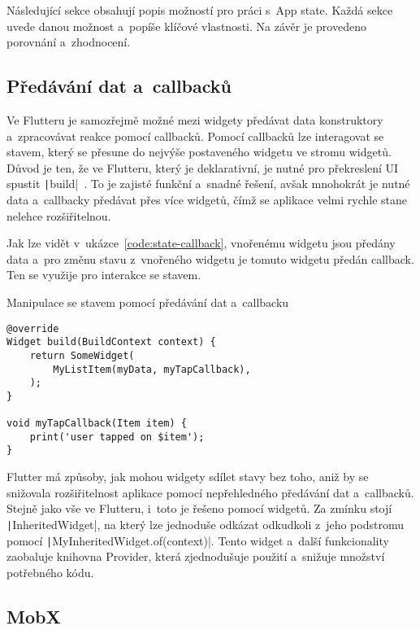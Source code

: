 Následující sekce obsahují popis možností pro práci s~App state.
Každá sekce uvede danou možnost a~popíše klíčové vlastnosti.
Na závěr je provedeno porovnání a~zhodnocení.

\subsection{Předávání dat a~callbacků}
\label{sec:data-callback-transfer}

Ve Flutteru je samozřejmě možné mezi widgety předávat data konstruktory
a~zpracovávat reakce pomocí callbacků. 
Pomocí callbacků lze interagovat se stavem,
který se přesune do nejvýše postaveného widgetu ve stromu widgetů.
Důvod je ten,
že ve Flutteru,
který je deklarativní,
je nutné pro překreslení UI spustit
\texttt|build|~\cite{flutter_state_mgmt_simple}.
To je zajisté funkční a~snadné řešení,
avšak mnohokrát je nutné data a~callbacky předávat přes více widgetů,
čímž se aplikace velmi rychle stane nelehce rozšiřitelnou.

Jak lze vidět v~ukázce~\ref{code:state-callback},
vnořenému widgetu jsou předány data
a~pro změnu stavu z~vnořeného widgetu je tomuto widgetu předán callback.
Ten se využije pro interakce se stavem.

\begin{listing}
    \caption{Manipulace se stavem pomocí předávání dat a~callbacku
\cite{flutter_state_mgmt_simple}}
    \label{code:state-callback}
    \begin{verbatim}
@override
Widget build(BuildContext context) {
    return SomeWidget(
        MyListItem(myData, myTapCallback),
    );
}

void myTapCallback(Item item) {
    print('user tapped on $item');
}
    \end{verbatim}
\end{listing}

Flutter má způsoby,
jak mohou widgety sdílet stavy bez toho,
aniž by se snižovala rozšiřitelnost aplikace pomocí nepřehledného předávání
dat a~callbacků.
Stejně jako vše ve Flutteru,
i~toto je řešeno pomocí widgetů.
Za zmínku stojí \texttt|InheritedWidget|,
na který lze jednoduše odkázat odkudkoli z~jeho \mbox{podstromu} pomocí
\texttt|MyInheritedWidget.of(context)|.
Tento widget a~další funkcionality zaobaluje knihovna Provider,
která zjednodušuje použití a~snižuje množství potřebného
kódu.~\cite{flutter_state_mgmt_simple}

\pagebreak
\subsection{MobX}

